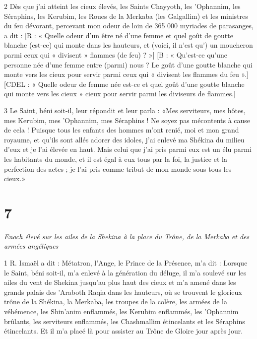 \par 2 Dès que j'ai atteint les cieux élevés, les Saints Chayyoth, les 'Ophannim, les Séraphins, les Kerubim, les Roues de la Merkaba (les Galgallim) et les ministres du feu dévorant, percevant mon odeur de loin de 365 000 myriades de parasanges, a dit : [R : « Quelle odeur d'un être né d'une femme et quel goût de goutte blanche (est-ce) qui monte dans les hauteurs, et (voici, il n'est qu') un moucheron parmi ceux qui « divisent » flammes (de feu) ? »] [B : « Qu'est-ce qu'une personne née d'une femme entre (parmi) nous ? Le goût d'une goutte blanche qui monte vers les cieux pour servir parmi ceux qui « divisent les flammes du feu ».] [CDEL : « Quelle odeur de femme née est-ce et quel goût d'une goutte blanche qui monte vers les cieux » cieux pour servir parmi les diviseurs de flammes.]

\par 3 Le Saint, béni soit-il, leur répondit et leur parla : «Mes serviteurs, mes hôtes, mes Kerubim, mes 'Ophannim, mes Séraphins ! Ne soyez pas mécontents à cause de cela ! Puisque tous les enfants des hommes m'ont renié, moi et mon grand royaume, et qu'ils sont allés adorer des idoles, j'ai enlevé ma Shékina du milieu d'eux et je l'ai élevée en haut. Mais celui que j'ai pris parmi eux est un élu parmi les habitants du monde, et il est égal à eux tous par la foi, la justice et la perfection des actes ; je l'ai pris comme tribut de mon monde sous tous les cieux.»

\chapter{7}

\par \textit{Enoch élevé sur les ailes de la Shekina à la place du Trône, de la Merkaba et des armées angéliques}

\par 1 R. Ismaël a dit : Métatron, l'Ange, le Prince de la Présence, m'a dit : Lorsque le Saint, béni soit-il, m'a enlevé à la génération du déluge, il m'a soulevé sur les ailes du vent de Shekina jusqu'au plus haut des cieux et m'a amené dans les grands palais des 'Araboth Raqia dans les hauteurs, où se trouvent le glorieux trône de la Shékina, la Merkaba, les troupes de la colère, les armées de la véhémence, les Shin'anim enflammés, les Kerubim enflammés, les 'Ophannim brûlants, les serviteurs enflammés, les Chashmallim étincelants et les Séraphins étincelants. Et il m'a placé là pour assister au Trône de Gloire jour après jour.


